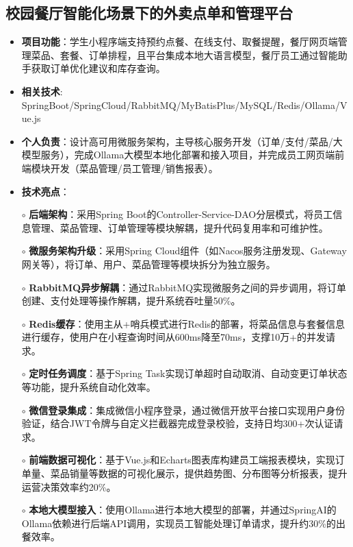 \subsection{\textbf{校园餐厅智能化场景下的外卖点单和管理平台} \hspace{2cm}{2025.01 -- 2025.04}}
    \begin{normalsize}
      \begin{itemize}
        \item \textbf{项目功能}：学生小程序端支持预约点餐、在线支付、取餐提醒，餐厅网页端管理菜品、套餐、订单排程，且平台集成本地大语言模型，餐厅员工通过智能助手获取订单优化建议和库存查询。
        \item \textbf{相关技术}: SpringBoot/SpringCloud/RabbitMQ/MyBatisPlus/MySQL/Redis/Ollama/Vue.js
        \item \textbf{个人负责}：设计高可用微服务架构，主导核心服务开发（订单/支付/菜品/大模型服务），完成Ollama大模型本地化部署和接入项目，并完成员工网页端前端模块开发（菜品管理/员工管理/销售报表）。
        \item \textbf{技术亮点}：
        \setlength{\itemindent}{1em} %
          \item[$\circ$] \textbf{后端架构}：采用Spring Boot的Controller-Service-DAO分层模式，将员工信息管理、菜品管理、订单管理等模块解耦，提升代码复用率和可维护性。
          \item[$\circ$] \textbf{微服务架构升级}：采用Spring Cloud组件（如Nacos服务注册发现、Gateway网关等），将订单、用户、菜品管理等模块拆分为独立服务。
          \item[$\circ$] \textbf{RabbitMQ异步解耦​​}：通过RabbitMQ实现微服务之间的异步调用，将订单创建、支付处理等操作解耦，提升系统吞吐量50\%。
          \item[$\circ$] \textbf{Redis缓存}：使用主从+哨兵模式进行Redis的部署，将菜品信息与套餐信息进行缓存，使用户在小程查询时间从600ms降至70ms，支撑10万+的并发请求。
          \item[$\circ$] \textbf{定时任务调度}：基于Spring Task实现订单超时自动取消、自动变更订单状态等功能，提升系统自动化效率。
          \item[$\circ$] \textbf{微信登录集成}：集成微信小程序登录，通过微信开放平台接口实现用户身份验证，结合JWT令牌与自定义拦截器完成登录校验，支持日均300+次认证请求。
          \item[$\circ$] \textbf{前端数据可视化}：基于Vue.js和Echarts图表库构建员工端报表模块，实现订单量、菜品销量等数据的可视化展示，提供趋势图、分布图等分析报表，提升运营决策效率约20\%。
          \item[$\circ$] \textbf{本地大模型接入}：使用Ollama进行本地大模型的部署，并通过SpringAI的Ollama依赖进行后端API调用，实现员工智能处理订单请求，提升约30\%的出餐效率。
        \end{itemize}
    \end{normalsize}